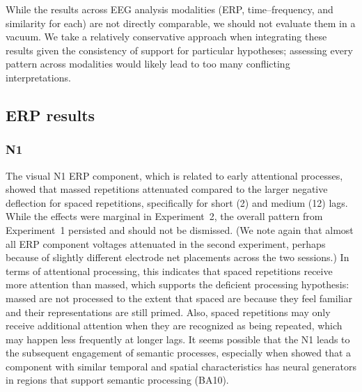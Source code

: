 While the results across EEG analysis modalities (ERP, time--frequency, and similarity for each) are not directly comparable, we should not evaluate them in a vacuum.  We take a relatively conservative approach when integrating these results given the consistency of support for particular hypotheses; assessing every pattern across modalities would likely lead to too many conflicting interpretations.


\subsection{ERP results}



\subsubsection{N1}


The visual N1 ERP component, which is related to early attentional processes, showed that massed repetitions attenuated compared to the larger negative deflection for spaced repetitions, specifically for short (2) and medium (12) lags.  While the effects were marginal in Experiment~2, the overall pattern from Experiment~1 persisted and should not be dismissed. (We note again that almost all ERP component voltages attenuated in the second experiment, perhaps because of slightly different electrode net placements across the two sessions.)  In terms of attentional processing, this indicates that spaced repetitions receive more attention than massed, which supports the deficient processing hypothesis: massed are not processed to the extent that spaced are because they feel familiar and their representations are still primed.  Also, spaced repetitions may only receive additional attention when they are recognized as being repeated, which may happen less frequently at longer lags.  It seems possible that the N1 leads to the subsequent engagement of semantic processes, especially when  showed that a component with similar temporal and spatial characteristics has neural generators in regions that support semantic processing (BA10).

